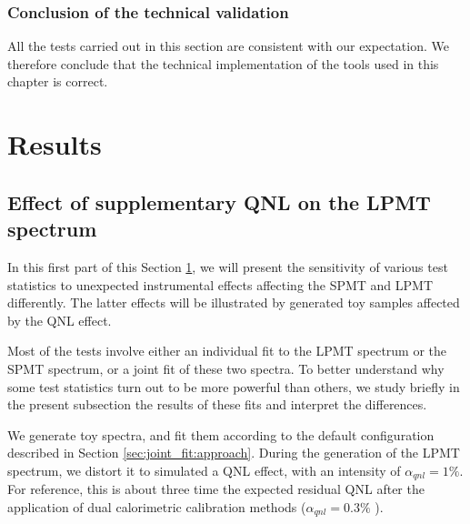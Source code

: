 \documentclass[../main.tex]{subfiles}
\begin{document}
\subsubsection{Conclusion of the technical validation}

All the tests carried out in this section are consistent with our expectation. We therefore conclude that the technical implementation of the tools used in this chapter is correct.



%
%
\section{Results}
\label{sec:joint_fit:results}

\subsection{Effect of supplementary QNL on the LPMT spectrum}

In this first part of this Section \ref{sec:joint_fit:results}, we will present the sensitivity of various test statistics to unexpected instrumental effects affecting the SPMT and LPMT differently. The latter effects will be illustrated by generated toy samples affected by the QNL effect.

Most of the tests involve either an individual fit to the LPMT spectrum or the SPMT spectrum, or a joint fit of these two spectra. To better understand why some test statistics turn out to be more powerful than others, we study briefly in the present subsection the results of these fits and interpret the differences.

We generate toy spectra, and fit them according to the default configuration described in Section \ref{sec:joint_fit:approach}.
During the generation of the LPMT spectrum, we distort it to simulated a QNL effect, with an intensity of $\alpha_{qnl}=1\%$. For reference, this is about three time the expected residual QNL after
the application of dual calorimetric calibration methods ($\alpha_{qnl} = 0.3\%$ \cite{juno_collaboration_calibration_2021}).
\end{document}
